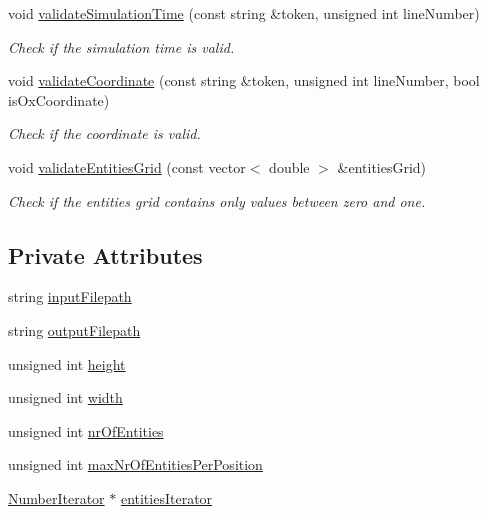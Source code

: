 \begin{DoxyCompactItemize}
void \hyperlink{classmultiscale_1_1video_1_1RectangularEntityCsvToInputFilesConverter_a8e331c649351b19275852c78688b9b6e}{validate\-Simulation\-Time} (const string \&token, unsigned int line\-Number)
\begin{DoxyCompactList}\small\item\em \-Check if the simulation time is valid. \end{DoxyCompactList}\item 
void \hyperlink{classmultiscale_1_1video_1_1RectangularEntityCsvToInputFilesConverter_a650edb40b60f1d51645d0d3cc502d348}{validate\-Coordinate} (const string \&token, unsigned int line\-Number, bool is\-Ox\-Coordinate)
\begin{DoxyCompactList}\small\item\em \-Check if the coordinate is valid. \end{DoxyCompactList}\item 
void \hyperlink{classmultiscale_1_1video_1_1RectangularEntityCsvToInputFilesConverter_a1ad5a7d2ff08fdda7ff04571e229cf95}{validate\-Entities\-Grid} (const vector$<$ double $>$ \&entities\-Grid)
\begin{DoxyCompactList}\small\item\em \-Check if the entities grid contains only values between zero and one. \end{DoxyCompactList}\end{DoxyCompactItemize}
\subsection*{\-Private \-Attributes}
\begin{DoxyCompactItemize}
\item 
string \hyperlink{classmultiscale_1_1video_1_1RectangularEntityCsvToInputFilesConverter_adde5ccc0bde141f73917eba8029fe1f6}{input\-Filepath}
\item 
string \hyperlink{classmultiscale_1_1video_1_1RectangularEntityCsvToInputFilesConverter_a84ea5fc8e195a17eb929812f962cb851}{output\-Filepath}
\item 
unsigned int \hyperlink{classmultiscale_1_1video_1_1RectangularEntityCsvToInputFilesConverter_a68cb5dba20157ea4977c1069626cb0ab}{height}
\item 
unsigned int \hyperlink{classmultiscale_1_1video_1_1RectangularEntityCsvToInputFilesConverter_ac4542ad4008e85ab4860146eed6e0200}{width}
\item 
unsigned int \hyperlink{classmultiscale_1_1video_1_1RectangularEntityCsvToInputFilesConverter_aebbddb80b0b0e44e4ea8e111994a2f5d}{nr\-Of\-Entities}
\item 
unsigned int \hyperlink{classmultiscale_1_1video_1_1RectangularEntityCsvToInputFilesConverter_adcea224ee3e6f8fbecca3754774afbac}{max\-Nr\-Of\-Entities\-Per\-Position}
\item 
\hyperlink{classmultiscale_1_1NumberIterator}{\-Number\-Iterator} $\ast$ \hyperlink{classmultiscale_1_1video_1_1RectangularEntityCsvToInputFilesConverter_a128a6c07e713073f96405819b014249e}{entities\-Iterator}
\end{DoxyCompactItemize}
